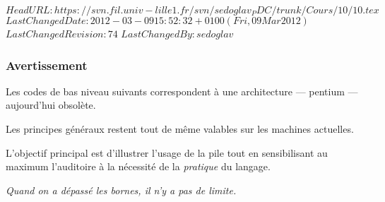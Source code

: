 \svnidlong 
{$HeadURL: https://svn.fil.univ-lille1.fr/svn/sedoglav_PDC/trunk/Cours/10/10.tex $} 
{$LastChangedDate: 2012-03-09 15:52:32 +0100 (Fri, 09 Mar 2012) $} 
{$LastChangedRevision: 74 $} 
{$LastChangedBy: sedoglav $} 
\begin{frame}
  \frametitle{Avertissement}%
  Les codes de bas niveau suivants correspondent \`a une architecture
  --- pentium --- aujourd'hui obsol\`ete. 
  \par\bigskip
  Les principes g\'en\'eraux restent tout de m\^eme valables sur les
  machines actuelles.
  \par\bigskip
  L'objectif principal est d'illustrer l'usage de la pile tout en
  sensibilisant au maximum l'auditoire \`a la n\'ecessit\'e de la
  \emph{pratique} du langage.
  \par\bigskip
  \emph{Quand on a d\'epass\'e les bornes, il n'y a pas de limite.}
\end{frame}
